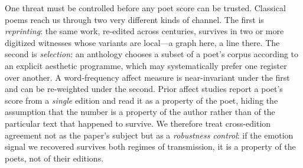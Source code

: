 \documentclass[10pt]{article}
\begin{document}
One threat must be controlled before any poet score can be trusted. Classical
poems reach us through two very different kinds of channel. The first is
\emph{reprinting}: the same work, re-edited across centuries, survives in two or
more digitized witnesses whose variants are local---a graph here, a line there. The
second is \emph{selection}: an anthology chooses a subset of a poet's corpus
according to an explicit aesthetic programme, which may systematically prefer one
register over another. A word-frequency affect measure is near-invariant under the
first and can be re-weighted under the second. Prior affect studies report a poet's
score from a \emph{single} edition and read it as a property of the poet, hiding
the assumption that the number is a property of the author rather than of the
particular text that happened to survive. We therefore treat cross-edition
agreement not as the paper's subject but as a \emph{robustness control}: if the
emotion signal we recovered survives both regimes of transmission, it is a property
of the poets, not of their editions.
\end{document}
